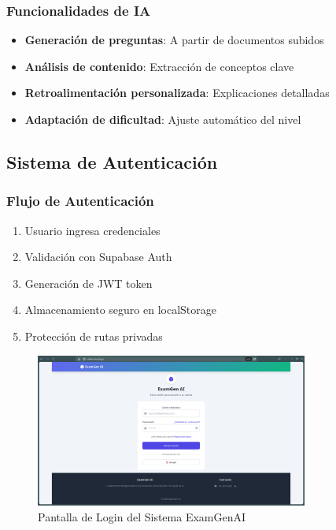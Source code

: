\documentclass[12pt,a4paper]{report}
\begin{document}
\subsubsection{Funcionalidades de IA}
\begin{itemize}
    \item \textbf{Generación de preguntas}: A partir de documentos subidos
    \item \textbf{Análisis de contenido}: Extracción de conceptos clave
    \item \textbf{Retroalimentación personalizada}: Explicaciones detalladas
    \item \textbf{Adaptación de dificultad}: Ajuste automático del nivel
\end{itemize}

\subsection{Sistema de Autenticación}

\subsubsection{Flujo de Autenticación}
\begin{enumerate}
    \item Usuario ingresa credenciales
    \item Validación con Supabase Auth
    \item Generación de JWT token
    \item Almacenamiento seguro en localStorage
    \item Protección de rutas privadas
\end{enumerate}

\begin{figure}[h]
\centering
\includegraphics[width=0.8\textwidth]{login_pantalla.png}
\caption{Pantalla de Login del Sistema ExamGenAI}
\label{fig:login}
\end{figure}
\end{document}
